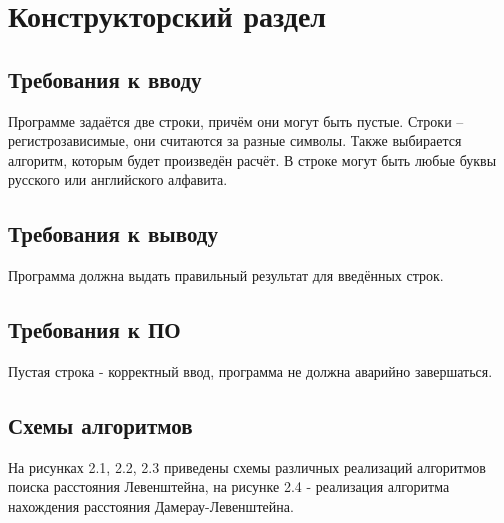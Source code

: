 \chapter{Конструкторский раздел}
\section{Требования к вводу}
Программе задаётся две строки, причём они могут быть пустые. 
Строки -- регистрозависимые, они считаются за разные символы.
 Также выбирается алгоритм, которым будет произведён расчёт. 
В строке могут быть любые буквы русского или английского алфавита.
\section{Требования к выводу}
Программа должна выдать правильный результат для введённых строк.
\section{Требования к ПО}
Пустая строка - корректный ввод, программа не должна аварийно завершаться.
\section{Схемы алгоритмов}
На рисунках 2.1, 2.2, 2.3 приведены схемы различных реализаций алгоритмов поиска расстояния Левенштейна, на рисунке 2.4 - реализация алгоритма нахождения расстояния Дамерау-Левенштейна.


